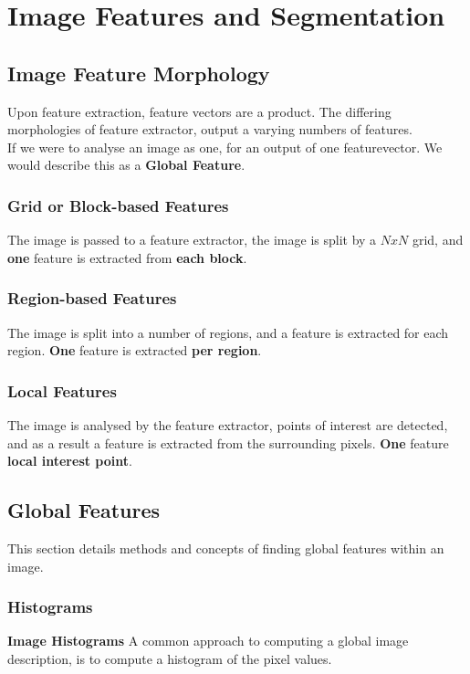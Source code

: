 \section{Image Features and Segmentation}

\subsection{Image Feature Morphology}

Upon feature extraction, feature vectors are a product. The differing morphologies of feature extractor, output a varying numbers of features. \\

\noindent If we were to analyse an image as one, for an output of one featurevector. We would describe this as a \textbf{Global Feature}.

\subsubsection{Grid or Block-based Features}
The image is passed to a feature extractor, the image is split by a $NxN$ grid, and \textbf{one} feature is extracted from \textbf{each block}. 

\subsubsection{Region-based Features}
The image is split into a number of regions, and a feature is extracted for each region. \textbf{One} feature is extracted \textbf{per region}.

\subsubsection{Local Features}
The image is analysed by the feature extractor, points of interest are detected, and as a result a feature is extracted from the surrounding pixels. \textbf{One} feature \textbf{local interest point}.

\subsection{Global Features}
This section details methods and concepts of finding global features within an image.
\subsubsection{Histograms}
\textbf{Image Histograms} A common approach to computing a global image description, is to compute a histogram of the pixel values. \\

